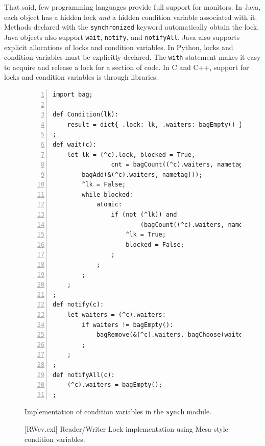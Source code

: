 \documentclass{report}
\newenvironment{code}{
\tcolorbox
}{
\endtcolorbox
}
\begin{document}
That said, few programming languages provide full support for monitors.
In Java, each object has a hidden lock \emph{and} a hidden condition variable
associated with it.
Methods declared with the \texttt{synchronized} keyword automatically
obtain the lock.  Java objects also support \texttt{wait}, \texttt{notify},
and \texttt{notifyAll}.  Java also supports explicit allocations of locks
and condition variables.
In Python, locks and condition variables must be explicitly declared.
The \texttt{with} statement makes it easy to acquire and release a lock
for a section of code.
In C and C++, support for locks and condition variables is through libraries.


\begin{figure}
\begin{code}
\begin{Verbatim}[xleftmargin=5mm,numbers=left]
import bag;

def Condition(lk):
    result = dict{ .lock: lk, .waiters: bagEmpty() };
;
def wait(c):
    let lk = (^c).lock, blocked = True,
                cnt = bagCount((^c).waiters, nametag()):
        bagAdd(&(^c).waiters, nametag());
        ^lk = False;
        while blocked:
            atomic:
                if (not (^lk)) and
                        (bagCount((^c).waiters, nametag()) <= cnt):
                    ^lk = True;
                    blocked = False;
                ;
            ;
        ;
    ;
;
def notify(c):
    let waiters = (^c).waiters:
        if waiters != bagEmpty():
            bagRemove(&(^c).waiters, bagChoose(waiters));
        ;
    ;
;
def notifyAll(c):
    (^c).waiters = bagEmpty();
;
\end{Verbatim}
\end{code}
\caption{Implementation of condition variables in the \texttt{synch} module.}
\label{fig:cv}
\end{figure}

\begin{figure}
\begin{code}
\end{code}
\caption{[RWcv.cxl] Reader/Writer Lock implementation using Mesa-style condition variables.}
\label{fig:RWcv}
\end{figure}
\end{document}
